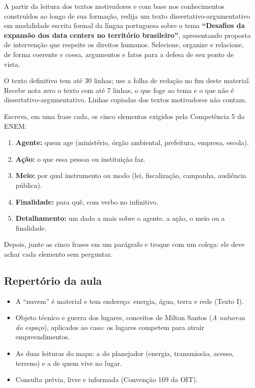 \documentclass[11pt]{article}
\begin{document}
\begin{redacao}[Proposta]
A partir da leitura dos textos motivadores e com base nos conhecimentos construídos ao longo de sua formação,
redija um texto dissertativo-argumentativo em modalidade escrita formal da língua portuguesa sobre o tema
\textbf{\enquote{Desafios da expansão dos data centers no território brasileiro}}, apresentando proposta de
intervenção que respeite os direitos humanos. Selecione, organize e relacione, de forma coerente e coesa,
argumentos e fatos para a defesa de seu ponto de vista.
\end{redacao}

\begin{destaque}[title={Instruções}]
O texto definitivo tem até 30 linhas; use a folha de redação no fim deste material. Recebe nota zero o texto com
até 7 linhas, o que foge ao tema e o que não é dissertativo-argumentativo. Linhas copiadas dos textos motivadores
não contam.
\end{destaque}

\begin{redacao}
Escreva, em uma frase cada, os cinco elementos exigidos pela Competência 5 do ENEM:
\begin{enumerate}
\item \textbf{Agente:} quem age (ministério, órgão ambiental, prefeitura, empresa, escola).
\item \textbf{Ação:} o que essa pessoa ou instituição faz.
\item \textbf{Meio:} por qual instrumento ou modo (lei, fiscalização, campanha, audiência pública).
\item \textbf{Finalidade:} para quê, com verbo no infinitivo.
\item \textbf{Detalhamento:} um dado a mais sobre o agente, a ação, o meio ou a finalidade.
\end{enumerate}
Depois, junte as cinco frases em um parágrafo e troque com um colega: ele deve achar cada elemento sem perguntar.
\end{redacao}

\subsection*{Repertório da aula}
\begin{itemize}
\item A \enquote{nuvem} é material e tem endereço: energia, água, terra e rede (Texto I).
\item Objeto técnico e guerra dos lugares, conceitos de Milton Santos (\emph{A natureza do espaço}), aplicados ao caso:
      os lugares competem para atrair empreendimentos.
\item As duas leituras do mapa: a do planejador (energia, transmissão, acesso, terreno) e a de quem vive no lugar.
\item Consulta prévia, livre e informada (Convenção 169 da OIT).
\end{itemize}
\end{document}
